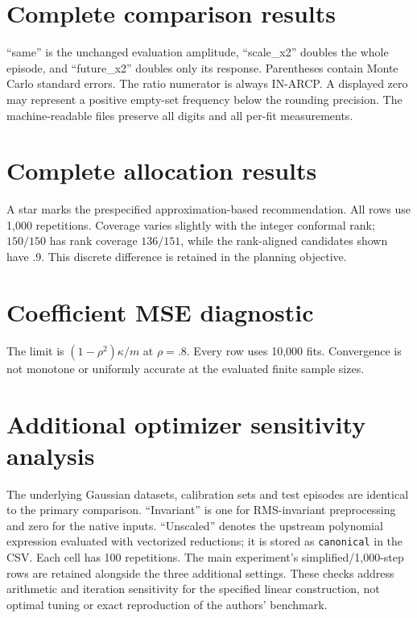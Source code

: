 \documentclass[10pt]{article}
\begin{document}
\section{Complete comparison results}
``same'' is the unchanged evaluation amplitude, ``scale\_x2'' doubles the whole episode, and ``future\_x2'' doubles only its response. Parentheses contain Monte Carlo standard errors. The ratio numerator is always IN-ARCP. A displayed zero may represent a positive empty-set frequency below the rounding precision. The machine-readable files preserve all digits and all per-fit measurements.


\section{Complete allocation results}
A star marks the prespecified approximation-based recommendation. All rows use 1,000 repetitions. Coverage varies slightly with the integer conformal rank; $150/150$ has rank coverage $136/151$, while the rank-aligned candidates shown have .9. This discrete difference is retained in the planning objective.


\section{Coefficient MSE diagnostic}
The limit is $(1-\rho^2)\kappa/m$ at $\rho=.8$. Every row uses 10,000 fits. Convergence is not monotone or uniformly accurate at the evaluated finite sample sizes.

\section{Additional optimizer sensitivity analysis}
The underlying Gaussian datasets, calibration sets and test episodes are identical to the primary comparison. ``Invariant'' is one for RMS-invariant preprocessing and zero for the native inputs. ``Unscaled'' denotes the upstream polynomial expression evaluated with vectorized reductions; it is stored as \texttt{canonical} in the CSV. Each cell has 100 repetitions. The main experiment's simplified/1,000-step rows are retained alongside the three additional settings. These checks address arithmetic and iteration sensitivity for the specified linear construction, not optimal tuning or exact reproduction of the authors' benchmark.

\end{document}
